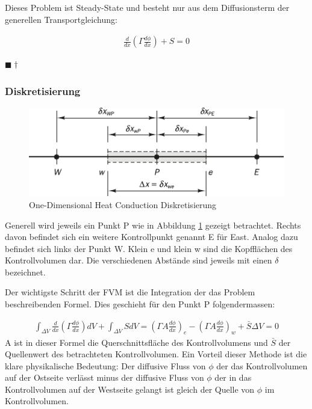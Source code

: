 \documentclass[a4paper]{scrartcl}
\newcommand{\qed}{\begin{flushright}
$\blacksquare \dagger$ \end{flushright}}
\begin{document}
 Dieses Problem ist Steady-State und besteht nur aus dem Diffusionsterm der
 generellen Transportgleichung:
 
 \begin{align}
 \frac{d}{dx} \left( \Gamma \frac{d\phi}{dx}\right) + S = 0
 \end{align}
 \qed

\subsubsection{Diskretisierung}


\begin{figure}[h]
\begin{center}
\includegraphics[scale=1.2]{images/42.pdf}
\caption{One-Dimensional Heat Conduction Diskretisierung}
\label{fig:42}
\end{center}
\end{figure}

Generell wird jeweils ein Punkt P wie in Abbildung \ref{fig:42} gezeigt
betrachtet. Rechts davon befindet sich ein weitere Kontrollpunkt genannt E für
East. Analog dazu befindet sich links der Punkt W. Klein e und klein w sind die
Kopfflächen des Kontrollvolumen dar. Die verschiedenen Abstände sind jeweils mit
einen $\delta$ bezeichnet.

Der wichtigste Schritt der FVM ist die Integration der das Problem
beschreibenden Formel. Dies geschieht für den Punkt P folgendermassen:

\begin{align}
\int_{\Delta V} \frac{d}{dx} \left( \Gamma \frac{d\phi}{dx}\right)dV +
\int_{\Delta V}SdV = \left(\Gamma A
\frac{d\phi}{dx}\right)_{e}-\left(\Gamma A \frac{d\phi}{dx}\right)_w +
\bar{S}\Delta V = 0
\end{align}
A ist in dieser Formel die Querschnittsfläche des Kontrollvolumens und $\bar{S}$
der Quellenwert des betrachteten Kontrollvolumen. Ein Vorteil dieser Methode ist
die klare physikalische Bedeutung: Der diffusive Fluss von $\phi$ der das
Kontrollvolumen auf der Ostseite verlässt minus der diffusive Fluss von $\phi$
der in das Kontrollvolumen auf der Westseite gelangt ist gleich der Quelle von
$\phi$ im Kontrollvolumen.
\end{document}
